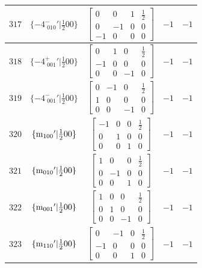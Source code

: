 \documentclass[fleqn,8pt]{jsarticle}
\begin{document}
\begin{longtable}{ccccc}
$ 317 $ & $ \{-4^{-}_{\,\,010}{}'|\frac{1}{2} 0 0\} $ & $ \begin{bmatrix} 0 & 0 & 1 & \frac{1}{2} \\ 0 & -1 & 0 & 0 \\ -1 & 0 & 0 & 0 \end{bmatrix} $ & $ -1 $ & $ -1 $ \\ \hline
$ 318 $ & $ \{-4^{+}_{\,\,001}{}'|\frac{1}{2} 0 0\} $ & $ \begin{bmatrix} 0 & 1 & 0 & \frac{1}{2} \\ -1 & 0 & 0 & 0 \\ 0 & 0 & -1 & 0 \end{bmatrix} $ & $ -1 $ & $ -1 $ \\ \hline
$ 319 $ & $ \{-4^{-}_{\,\,001}{}'|\frac{1}{2} 0 0\} $ & $ \begin{bmatrix} 0 & -1 & 0 & \frac{1}{2} \\ 1 & 0 & 0 & 0 \\ 0 & 0 & -1 & 0 \end{bmatrix} $ & $ -1 $ & $ -1 $ \\ \hline
$ 320 $ & $ \{{\rm m}_{100}{}'|\frac{1}{2} 0 0\} $ & $ \begin{bmatrix} -1 & 0 & 0 & \frac{1}{2} \\ 0 & 1 & 0 & 0 \\ 0 & 0 & 1 & 0 \end{bmatrix} $ & $ -1 $ & $ -1 $ \\ \hline
$ 321 $ & $ \{{\rm m}_{010}{}'|\frac{1}{2} 0 0\} $ & $ \begin{bmatrix} 1 & 0 & 0 & \frac{1}{2} \\ 0 & -1 & 0 & 0 \\ 0 & 0 & 1 & 0 \end{bmatrix} $ & $ -1 $ & $ -1 $ \\ \hline
$ 322 $ & $ \{{\rm m}_{001}{}'|\frac{1}{2} 0 0\} $ & $ \begin{bmatrix} 1 & 0 & 0 & \frac{1}{2} \\ 0 & 1 & 0 & 0 \\ 0 & 0 & -1 & 0 \end{bmatrix} $ & $ -1 $ & $ -1 $ \\ \hline
$ 323 $ & $ \{{\rm m}_{110}{}'|\frac{1}{2} 0 0\} $ & $ \begin{bmatrix} 0 & -1 & 0 & \frac{1}{2} \\ -1 & 0 & 0 & 0 \\ 0 & 0 & 1 & 0 \end{bmatrix} $ & $ -1 $ & $ -1 $ \\ \hline

\end{longtable}
\end{document}
